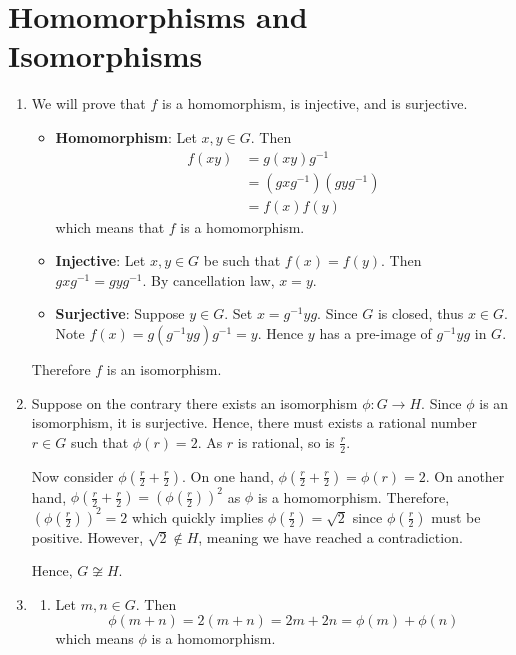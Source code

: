 \section{Homomorphisms and Isomorphisms}
\begin{enumerate}
    \item We will prove that $f$ is a homomorphism, is injective, and is surjective.
    \begin{itemize}
        \item \textbf{Homomorphism}: Let $x, y \in G$. Then
        \begin{align*}
            f(xy) &= g(xy)g^{-1}\\
            &= (gxg^{-1})(gyg^{-1})\\
            &= f(x)f(y)
        \end{align*}
        which means that $f$ is a homomorphism.
        \item \textbf{Injective}: Let $x, y \in G$ be such that $f(x) = f(y)$. Then $gxg^{-1} = gyg^{-1}$. By cancellation law, $x = y$.
        \item \textbf{Surjective}: Suppose $y \in G$. Set $x = g^{-1}yg$. Since $G$ is closed, thus $x \in G$. Note $f(x) = g(g^{-1}yg)g^{-1} = y$. Hence $y$ has a pre-image of $g^{-1}yg$ in $G$.
    \end{itemize}
    Therefore $f$ is an isomorphism.

    \item Suppose on the contrary there exists an isomorphism $\phi: G \to H$. Since $\phi$ is an isomorphism, it is surjective. Hence, there must exists a rational number $r \in G$ such that $\phi(r) = 2$. As $r$ is rational, so is $\frac r2$.

    Now consider $\phi\left(\frac r2 + \frac r2\right)$. On one hand, $\phi\left(\frac r2 + \frac r2\right) = \phi(r) = 2$. On another hand, $\phi(\frac r2 + \frac r2) = \left(\phi\left(\frac r2\right)\right)^2$ as $\phi$ is a homomorphism. Therefore, $\left(\phi\left(\frac r2\right)\right)^2 = 2$ which quickly implies $\phi\left(\frac r2\right) = \sqrt 2$ since $\phi\left(\frac r2\right)$ must be positive. However, $\sqrt 2 \notin H$, meaning we have reached a contradiction.

    Hence, $G \not\cong H$.

    \item \begin{enumerate}[label=(\alph*)]
        \item Let $m, n \in G$. Then
        \[
            \phi(m + n) = 2(m + n) = 2m + 2n = \phi(m) + \phi(n)
        \]
        which means $\phi$ is a homomorphism.


\end{enumerate}
\end{enumerate}
